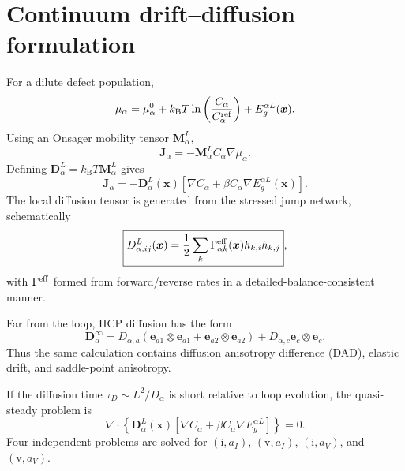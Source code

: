 \documentclass[11pt]{article}
\newcommand{\kb}{k_{\mathrm B}}
\newcommand{\ii}{\mathrm i}
\newcommand{\vv}{\mathrm v}
\newcommand{\bJ}{\bm{J}}
\newcommand{\bD}{\bm{D}}
\newcommand{\bx}{\bm{x}}
\begin{document}
\section{Continuum drift--diffusion formulation}
For a dilute defect population,
\begin{equation}
\mu_\alpha=\mu_\alpha^0+\kb T\ln\left(\frac{C_\alpha}{C_\alpha^{\rm ref}}\right)+E_g^{\alpha L}(\bx).
\end{equation}
Using an Onsager mobility tensor $\bm M_\alpha^L$,
\begin{equation}
\bJ_\alpha=-\bm M_\alpha^L C_\alpha\nabla\mu_\alpha.
\end{equation}
Defining $\bD_\alpha^L=\kb T\bm M_\alpha^L$ gives
\begin{equation}
\boxed{\bJ_\alpha=-\bD_\alpha^L(\bx)\left[\nabla C_\alpha+\beta C_\alpha\nabla E_g^{\alpha L}(\bx)\right]}.
\end{equation}
The local diffusion tensor is generated from the stressed jump network, schematically
\begin{equation}
\boxed{D_{\alpha,ij}^{L}(\bx)=\frac12\sum_k\Gamma_{\alpha k}^{\rm eff}(\bx)h_{k,i}h_{k,j}},
\end{equation}
with $\Gamma^{\rm eff}$ formed from forward/reverse rates in a detailed-balance-consistent manner.

Far from the loop, HCP diffusion has the form
\begin{equation}
\bD_\alpha^\infty=D_{\alpha,a}(\bm e_{a1}\otimes\bm e_{a1}+\bm e_{a2}\otimes\bm e_{a2})+D_{\alpha,c}\bm e_c\otimes\bm e_c.
\end{equation}
Thus the same calculation contains diffusion anisotropy difference (DAD), elastic drift, and saddle-point anisotropy.

If the diffusion time $\tau_D\sim L^2/D_\alpha$ is short relative to loop evolution, the quasi-steady problem is
\begin{equation}
\boxed{\nabla\cdot\left\{\bD_\alpha^L(\bx)\left[\nabla C_\alpha+\beta C_\alpha\nabla E_g^{\alpha L}\right]\right\}=0}.
\end{equation}
Four independent problems are solved for $(\ii,a_I)$, $(\vv,a_I)$, $(\ii,a_V)$, and $(\vv,a_V)$.
\end{document}
